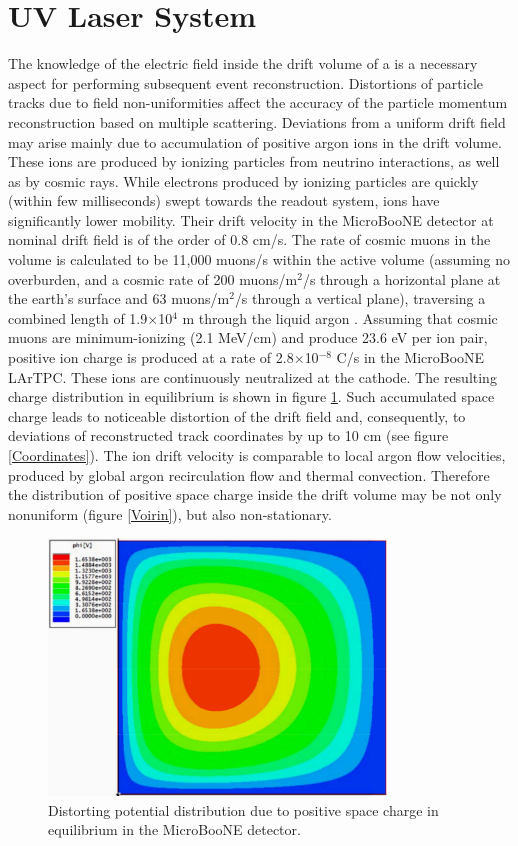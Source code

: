 \section{UV Laser System}
\label{sec:laser}

The knowledge of the electric field inside the drift volume of a \lartpc is a necessary aspect for performing subsequent event reconstruction. Distortions of particle tracks due to field non-uniformities affect the accuracy of the particle momentum reconstruction based on multiple scattering.  Deviations from a uniform drift field may arise mainly due to accumulation of positive argon ions in the drift volume. These ions are produced by ionizing particles from neutrino interactions, as well as by cosmic rays. While electrons produced by ionizing particles are quickly (within few milliseconds) swept towards the readout system, ions have significantly lower mobility. Their drift velocity in the MicroBooNE detector at nominal drift field is of the order of 0.8 cm/s. The rate of cosmic muons in the \lartpc volume is calculated to be 11,000 muons/s within the active volume (assuming no overburden, and a cosmic rate of 200 muons/m$^2$/s through a horizontal plane at the earth's surface and 63 muons/m$^2$/s through a vertical plane), traversing a combined length of 1.9$\times$10$^4$ m through the liquid argon \cite{mcdonald1,mcdonald2}.  Assuming that cosmic muons are minimum-ionizing (2.1 MeV/cm) and produce 23.6 eV per ion pair, positive ion charge is produced at a rate of 2.8$\times$10$^{-8}$ C/s in the MicroBooNE LArTPC. These ions are continuously neutralized at the cathode. The resulting charge distribution in equilibrium is shown in figure \ref{Ions}. Such accumulated space charge leads to noticeable distortion of the drift field and, consequently, to deviations of reconstructed track coordinates by up to 10 cm (see figure \ref{Coordinates}).  The ion drift velocity is comparable to local argon flow velocities, produced by global argon recirculation flow and thermal convection. Therefore the distribution of positive space charge inside the drift volume may be not only nonuniform (figure \ref{Voirin}), but also non-stationary.

\begin{figure}[htb]
\centering	
\includegraphics[width=0.8\textwidth]{figures/Potential.pdf}
\caption{Distorting potential distribution due to positive space charge in equilibrium in the MicroBooNE detector.}
\label{Ions}
\end{figure}

